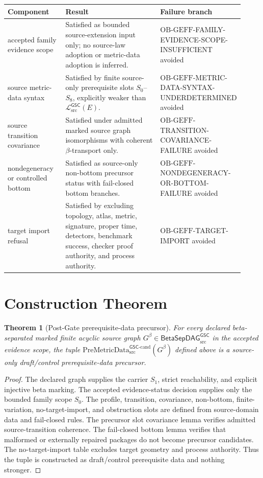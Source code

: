 \documentclass[11pt]{article}
\newcommand{\PreMetricData}{\mathrm{PreMetricData}_{\mathrm{src}}^{\mathsf{GSC}\mbox{-}\mathrm{cand}}}
\newcommand{\MetricData}{\mathcal{L}_{\mathrm{src}}^{\mathsf{GSC}}}
\newcommand{\BetaGraph}{\mathsf{BetaSepDAG}_{\mathrm{src}}^{\mathsf{GSC}}}
\newcommand{\Gbeta}{G^\beta}
\newcommand{\OBGEFF}{\mathrm{OB\mbox{-}GEFF}}
\newtheorem{theorem}{Theorem}
\begin{document}
\begin{longtable}{p{0.25\linewidth}p{0.45\linewidth}p{0.22\linewidth}}
\toprule
Component & Result & Failure branch \\
\midrule
accepted family evidence scope &
Satisfied as bounded source-extension input only; no source-law adoption or
metric-data adoption is inferred. &
\(\OBGEFF\)-FAMILY-EVIDENCE-SCOPE-INSUFFICIENT avoided \\
source metric-data syntax &
Satisfied by finite source-only prerequisite slots \(S_0\)--\(S_8\), explicitly
weaker than \(\MetricData(E)\). &
\(\OBGEFF\)-METRIC-DATA-SYNTAX-UNDERDETERMINED avoided \\
source transition covariance &
Satisfied under admitted marked source graph isomorphisms with coherent
\(\beta\)-transport only. &
\(\OBGEFF\)-TRANSITION-COVARIANCE-FAILURE avoided \\
nondegeneracy or controlled bottom &
Satisfied as source-only non-bottom precursor status with fail-closed bottom
branches. &
\(\OBGEFF\)-NONDEGENERACY-OR-BOTTOM-FAILURE avoided \\
target import refusal &
Satisfied by excluding topology, atlas, metric, signature, proper time,
detectors, benchmark success, checker proof authority, and process authority. &
\(\OBGEFF\)-TARGET-IMPORT avoided \\
\bottomrule
\end{longtable}

\section{Construction Theorem}

\begin{theorem}[Post-Gate prerequisite-data precursor]
For every declared beta-separated marked finite acyclic source graph
\(\Gbeta\in\BetaGraph\) in the accepted evidence scope, the tuple
\(\PreMetricData(\Gbeta)\) defined above is a source-only draft/control
prerequisite-data precursor.
\end{theorem}

\begin{proof}
The declared graph supplies the carrier \(S_1\), strict reachability, and
explicit injective beta marking. The accepted evidence-status decision supplies
only the bounded family scope \(S_0\). The profile, transition, covariance,
non-bottom, finite-variation, no-target-import, and obstruction slots are
defined from source-domain data and fail-closed rules. The precursor slot
covariance lemma verifies admitted source-transition coherence. The fail-closed
bottom lemma verifies that malformed or externally repaired packages do not
become precursor candidates. The no-target-import table excludes target
geometry and process authority. Thus the tuple is constructed as
draft/control prerequisite data and nothing stronger.
\end{proof}
\end{document}
